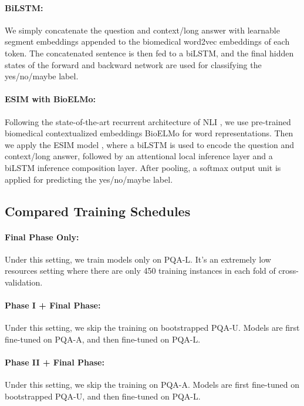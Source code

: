 \documentclass[11pt,a4paper]{article}
\begin{document}
\paragraph{BiLSTM:} We simply concatenate the question and context/long answer with learnable segment embeddings appended to the biomedical word2vec embeddings \cite{Pyysalo2013DistributionalSR} of each token. The concatenated sentence is then fed to a biLSTM, and the final hidden states of the forward and backward network are used for classifying the yes/no/maybe label.

\paragraph{ESIM with BioELMo:} Following the state-of-the-art recurrent architecture of NLI \cite{peters2018deep}, we use pre-trained biomedical contextualized embeddings BioELMo \cite{jin2019probing} for word representations. Then we apply the ESIM model \cite{chen2016enhanced}, where a biLSTM is used to encode the question and context/long answer, followed by an attentional local inference layer and a biLSTM inference composition layer. After pooling, a softmax output unit is applied for predicting the yes/no/maybe label.

\subsection{Compared Training Schedules}
\paragraph{Final Phase Only:}
Under this setting, we train models only on PQA-L. It's an extremely low resources setting where there are only 450 training instances in each fold of cross-validation.

\paragraph{Phase I + Final Phase:}
Under this setting, we skip the training on bootstrapped PQA-U. Models are first fine-tuned on PQA-A, and then fine-tuned on PQA-L.

\paragraph{Phase II + Final Phase:}
Under this setting, we skip the training on PQA-A. Models are first fine-tuned on bootstrapped PQA-U, and then fine-tuned on PQA-L. 
\end{document}
